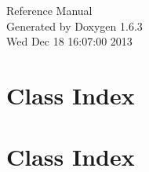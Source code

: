 \documentclass[a4paper]{book}
\begin{document}
\hypersetup{pageanchor=false}
\begin{titlepage}
\vspace*{7cm}
\begin{center}
{\Large Reference Manual}\\
\vspace*{1cm}
{\large Generated by Doxygen 1.6.3}\\
\vspace*{0.5cm}
{\small Wed Dec 18 16:07:00 2013}\\
\end{center}
\end{titlepage}
\clearemptydoublepage
{}
\tableofcontents
\clearemptydoublepage
{}
\hypersetup{pageanchor=true}
\chapter{Class Index}

\chapter{Class Index}

\end{document}
